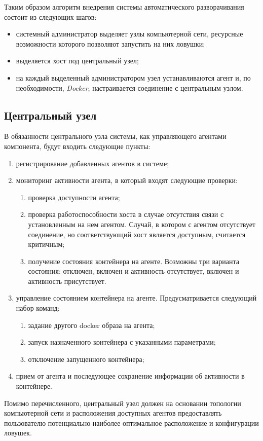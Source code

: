 Таким образом алгоритм внедрения системы автоматического разворачивания состоит из следующих шагов:

\begin{itemize}
	\item системный администратор выделяет узлы компьютерной сети, ресурсные возможности которого позволяют запустить на них ловушки;
	\item выделяется хост под центральный узел;
	\item на каждый выделенный администратором узел устанавливаются агент и, по необходимости, \textit{Docker}, настраивается соединение с центральным узлом.
\end{itemize}


\subsection{Центральный узел}

В обязанности центрального узла системы, как управляющего агентами компонента, будут входить следующие пункты:

\begin{enumerate}
	\item регистрирование добавленных агентов в системе;
	\item мониторинг активности агента, в который входят следующие проверки:
		\begin{enumerate}
			\item проверка доступности агента;
			\item проверка работоспособности хоста в случае отсутствия связи с установленным на нем агентом. Случай, в котором с агентом отсутствует соединение, но соответствующий хост является доступным, считается критичным;
			\item получение состояния контейнера на агенте. Возможны три варианта состояния: отключен, включен и активность отсутствует, включен и активность присутствует.	
		\end{enumerate}
	\item управление состоянием контейнера на агенте. Предусматривается следующий набор команд:
		\begin{enumerate}
			\item задание другого docker образа на агента;
			\item запуск назначенного контейнера с указанными параметрами;
			\item отключение запущенного контейнера;
		\end{enumerate}
	\item прием от агента и последующее сохранение информации об активности в контейнере.
\end{enumerate}

Помимо перечисленного, центральный узел должен на основании топологии компьютерной сети и расположения доступных агентов предоставлять пользователю потенциально наиболее оптимальное расположение и конфигурации ловушек.